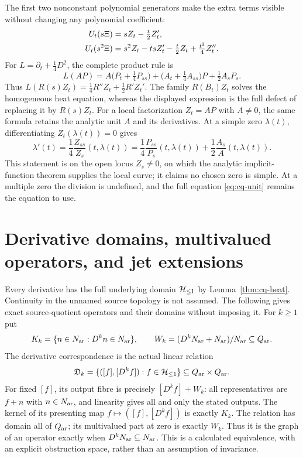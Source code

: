 The first two nonconstant polynomial generators make the extra terms
visible without changing any polynomial coefficient:
\begin{align}\label{eq:cq-generators}
 U_t(s\Xi)&=sZ_t-\tfrac t2Z_t',\notag\\
 U_t(s^2\Xi)&=s^2Z_t-t sZ_t'-\tfrac t2Z_t+\tfrac{t^2}4Z_t''.
\end{align}
For $L=\partial_t+\tfrac14D^2$, the complete product rule is
\begin{equation}\label{eq:cq-unit}
 L(AP)=A\bigl(P_t+\tfrac14P_{ss}\bigr)
       +\bigl(A_t+\tfrac14A_{ss}\bigr)P
       +\tfrac12A_sP_s.
\end{equation}
Thus $L(R(s)Z_t)=\tfrac14R''Z_t+\tfrac12R'Z_t'$.
The family $R(B_t)Z_t$ solves the homogeneous heat equation, whereas
the displayed expression is the full defect of replacing it by
$R(s)Z_t$. For a local factorization $Z_t=AP$ with $A\ne0$,
the same formula retains the analytic unit $A$ and its derivatives.
At a simple zero $\lambda(t)$, differentiating
$Z_t(\lambda(t))=0$ gives
\begin{equation}\label{eq:cq-zero}
 \lambda'(t)=\frac14\frac{Z_{ss}}{Z_s}(t,\lambda(t))
 =\frac14\frac{P_{ss}}{P_s}(t,\lambda(t))
    +\frac12\frac{A_s}{A}(t,\lambda(t)).
\end{equation}
This statement is on the open locus $Z_s\ne0$, on which the analytic
implicit-function theorem supplies the local curve; it claims no
chosen zero is simple. At a multiple zero the division is undefined,
and the full equation \eqref{eq:cq-unit} remains the equation to use.

\section{Derivative domains, multivalued operators, and jet extensions}
\label{sec:cq-jets}
Every derivative has the full underlying domain $\mathcal H_{\leq 1}$ by
Lemma~\ref{thm:cq-heat}. Continuity in the unnamed source topology is
not assumed. The following gives exact source-quotient operators and
their domains without imposing it. For $k\geq1$ put
\[
 K_k=\{n\in N_{\rm ar}:D^kn\in N_{\rm ar}\},\qquad
 W_k=(D^kN_{\rm ar}+N_{\rm ar})/N_{\rm ar}\subseteq Q_{\rm ar}.
\]
The derivative correspondence is the actual linear relation
\begin{equation}\label{eq:cq-relation}
 \mathfrak D_k=\{([f],[D^kf]):f\in\mathcal H_{\leq 1}\}
                    \subseteq Q_{\rm ar}\times Q_{\rm ar}.
\end{equation}
For fixed $[f]$, its output fibre is precisely $[D^kf]+W_k$:
all representatives are $f+n$ with $n\in N_{\rm ar}$, and linearity gives
all and only the stated outputs. The kernel of its presenting map
$f\mapsto([f],[D^kf])$ is exactly $K_k$. The relation has domain
all of $Q_{\rm ar}$; its multivalued part at zero is exactly $W_k$.
Thus it is the graph of an operator exactly when $D^kN_{\rm ar}\subseteq
N_{\rm ar}$. This is a calculated equivalence, with an explicit obstruction
space, rather than an assumption of invariance.

